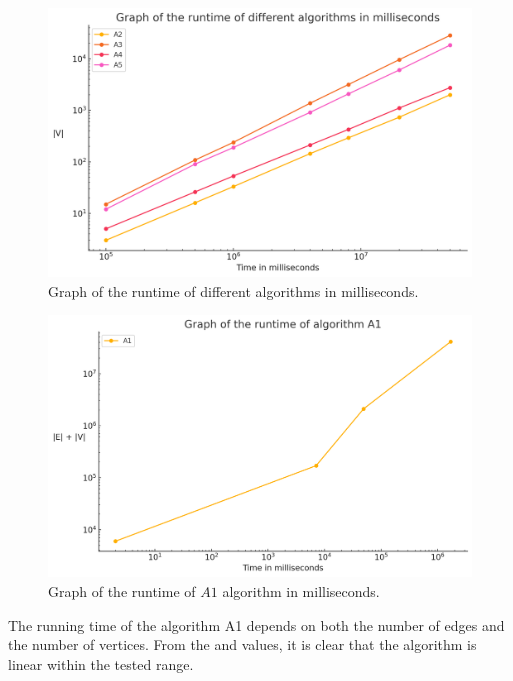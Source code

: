 \begin{figure}[h!]
  \centering
  \includegraphics[width=\linewidth]{output (3).png}
  \caption{Graph of the runtime of different algorithms in milliseconds.}
  \label{fig:milliseconds}
\end{figure}


\begin{figure}[h!]
  \centering
  \includegraphics[width=\linewidth]{output (2).png}
  \caption{Graph of the runtime of $A1$ algorithm in milliseconds.}
  \label{fig:100milliseconds}
\end{figure}

The running time of the algorithm A1 depends on both the number of edges and the number of vertices. From the  and  values, it is clear that the algorithm is linear within the tested range.